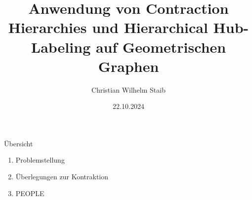 \documentclass[t,xcolor={dvipsnames}]{beamer}
\title{Anwendung von Contraction Hierarchies und Hierarchical Hub-Labeling auf Geometrischen Graphen}
\author{Christian Wilhelm Staib}
\institute{Abschlusspräsentation Bachelorarbeit \\ Universität Stuttgart}
\date{22.10.2024}
\theoremstyle{definition}
\begin{document}
\begin{frame}
    \maketitle
\end{frame}


\begin{frame}{Übersicht}
    \begin{enumerate}[label = \arabic*)]
        \item
              Problemstellung

        \item
              Überlegungen zur Kontraktion

        \item
              PEOPLE
    \end{enumerate}
\end{frame}

\end{document}
